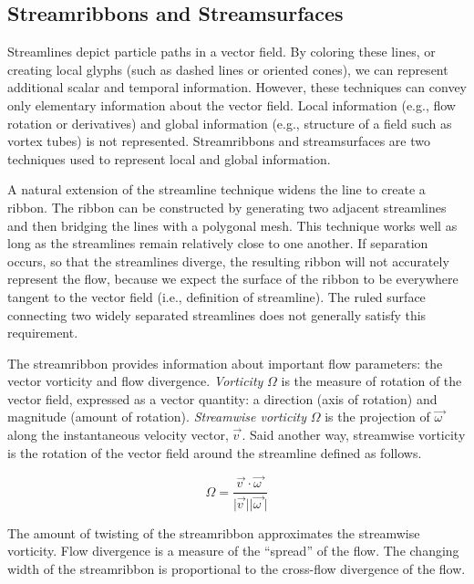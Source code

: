 \subsection{Streamribbons and Streamsurfaces}

Streamlines depict particle paths in a vector field. By coloring these lines, or creating local glyphs (such as dashed lines or oriented cones), we can represent additional scalar and temporal information. However, these techniques can convey only elementary information about the vector field. Local information (e.g., flow rotation or derivatives) and global information (e.g., structure of a field such as vortex tubes) is not represented. Streamribbons and streamsurfaces are two techniques used to represent local and global information.

A natural extension of the streamline technique widens the line to create a ribbon. The ribbon can be constructed by generating two adjacent streamlines and then bridging the lines with a polygonal mesh. This technique works well as long as the streamlines remain relatively close to one another. If separation occurs, so that the streamlines diverge, the resulting ribbon will not accurately represent the flow, because we expect the surface of the ribbon to be everywhere tangent to the vector field (i.e., definition of streamline). The ruled surface connecting two widely separated streamlines does not generally satisfy this requirement.

The streamribbon provides information about important flow parameters: the vector vorticity and flow divergence. \emph{Vorticity} $\Omega$ is the measure of rotation of the vector field, expressed as a vector quantity: a direction (axis of rotation) and magnitude (amount of rotation). \emph{Streamwise vorticity} $\Omega$ is the projection of $\overrightarrow{\omega\ }$ along the instantaneous velocity vector, $\overrightarrow{v\ }$. Said another way, streamwise vorticity is the rotation of the vector field around the streamline defined as follows.

\begin{equation}\label{eq:9.3}
\Omega = \frac{\overrightarrow{v\ } \cdot \overrightarrow{\omega\ }}{\vert \overrightarrow{v\ } \vert \vert \overrightarrow{\omega\ } \vert}
\end{equation}

The amount of twisting of the streamribbon approximates the streamwise vorticity. Flow divergence is a measure of the ``spread'' of the flow. The changing width of the streamribbon is proportional to the cross-flow divergence of the flow.


